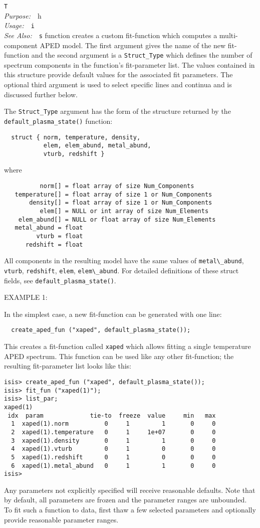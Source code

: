 \documentclass{book}
\makeatletter
\newif\ifpdf
\newenvironment{isisfunction}[4]%
{\index{{#1}@{\tt #1}}%
  \ifpdf
  \else
     \addcontentsline{toc}{subsection}{{#1} -- {#2}}
  \fi
  \vbox{
          \vspace*{\baselineskip}
          {\LARGE\tt #1}\vspace*{\baselineskip}\\
          {{\it Purpose:}~~{#2}}\\
          {{\it Usage:}~~{\tt #3}}\\
          {{\it See Also:}~~{\tt #4}}
       }
}%
{ }
\makeatother
\begin{document}
{\begin{isisfunction}
This function creates a custom fit-function which computes a
multi-component APED model. The first argument gives the name of
the new fit-function and the second argument is a
\verb|Struct_Type| which defines the number of spectrum components
in the function's fit-parameter list. The values contained
in this structure provide default values for the associated fit
parameters. The optional third argument
is used to select specific lines and continua and is discussed
further below.

The \verb|Struct_Type| argument has the form of the structure
returned by the \verb|default_plasma_state()| function:
\begin{verbatim}
  struct { norm, temperature, density,
           elem, elem_abund, metal_abund,
           vturb, redshift }
\end{verbatim}
where
\begin{verbatim}
          norm[] = float array of size Num_Components
   temperature[] = float array of size 1 or Num_Components
       density[] = float array of size 1 or Num_Components
          elem[] = NULL or int array of size Num_Elements
    elem_abund[] = NULL or float array of size Num_Elements
   metal_abund = float
         vturb = float
      redshift = float
\end{verbatim}
All components in the resulting model have the same values of
\verb|metal\_abund|, \verb|vturb|, \verb|redshift|, \verb|elem|,
\verb|elem\_abund|.  For detailed definitions of these struct
fields, see \verb|default_plasma_state()|.

EXAMPLE 1:

In the simplest case, a new fit-function can
be generated with one line:
\begin{verbatim}
  create_aped_fun ("xaped", default_plasma_state());
\end{verbatim}
This creates a fit-function called \verb|xaped| which allows
fitting a single temperature APED spectrum.  This function can be
used like any other fit-function; the resulting fit-parameter list
looks like this:
\begin{verbatim}
isis> create_aped_fun ("xaped", default_plasma_state());
isis> fit_fun ("xaped(1)");
isis> list_par;
xaped(1)
 idx  param             tie-to  freeze  value     min   max
  1  xaped(1).norm          0     1         1       0     0
  2  xaped(1).temperature   0     1     1e+07       0     0
  3  xaped(1).density       0     1         1       0     0
  4  xaped(1).vturb         0     1         0       0     0
  5  xaped(1).redshift      0     1         0       0     0
  6  xaped(1).metal_abund   0     1         1       0     0
isis>
\end{verbatim}
Any parameters not explicitly specified will receive reasonable
defaults. Note that by default, all parameters are frozen and the
parameter ranges are unbounded.  To fit such a function
to data, first thaw a few selected parameters and optionally
provide reasonable parameter ranges.


\end{isisfunction}}
\end{document}
